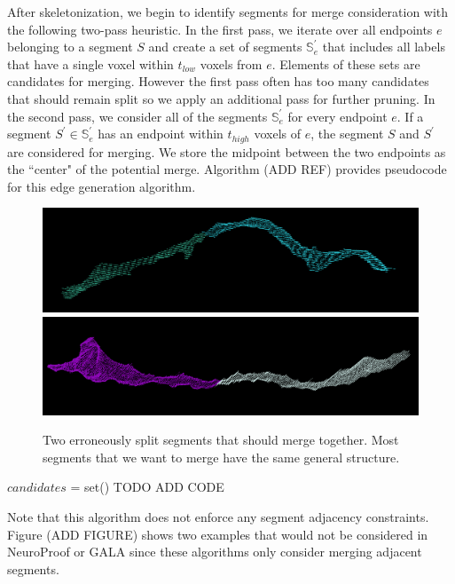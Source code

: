 After skeletonization, we begin to identify segments for merge consideration with the following two-pass heuristic.
In the first pass, we iterate over all endpoints $e$ belonging to a segment $S$ and create a set of segments $\mathbb{S}_e^\prime$ that includes all labels that have a single voxel within $t_{low}$ voxels from $e$. 
Elements of these sets are candidates for merging.
However the first pass often has too many candidates that should remain split so we apply an additional pass for further pruning.
In the second pass, we consider all of the segments $\mathbb{S}_e^\prime$ for every endpoint $e$. 
If a segment $S^\prime \in \mathbb{S}_e^\prime$ has an endpoint within $t_{high}$ voxels of $e$, the segment $S$ and $S^\prime$ are considered for merging. 
We store the midpoint between the two endpoints as the ``center" of the potential merge.
Algorithm (ADD REF) provides pseudocode for this edge generation algorithm. 

\begin{figure}[t]
	\centering
	\includegraphics[width=0.92\linewidth]{./figures/split_error1.png}
	\includegraphics[width=0.92\linewidth]{./figures/split_error2.png}
	\caption{Two erroneously split segments that should merge together. Most segments that we want to merge have the same general structure.}
	\label{fig:merge_candidates}
\end{figure}


\begin{algorithmic}
			\State $candidates$ = set()
				\State TODO ADD CODE
			\EndFor
		\EndFor
	\EndFunction
\end{algorithmic}

Note that this algorithm does not enforce any segment adjacency constraints.
Figure (ADD FIGURE) shows two examples that would not be considered in NeuroProof or GALA since these algorithms only consider merging adjacent segments.

